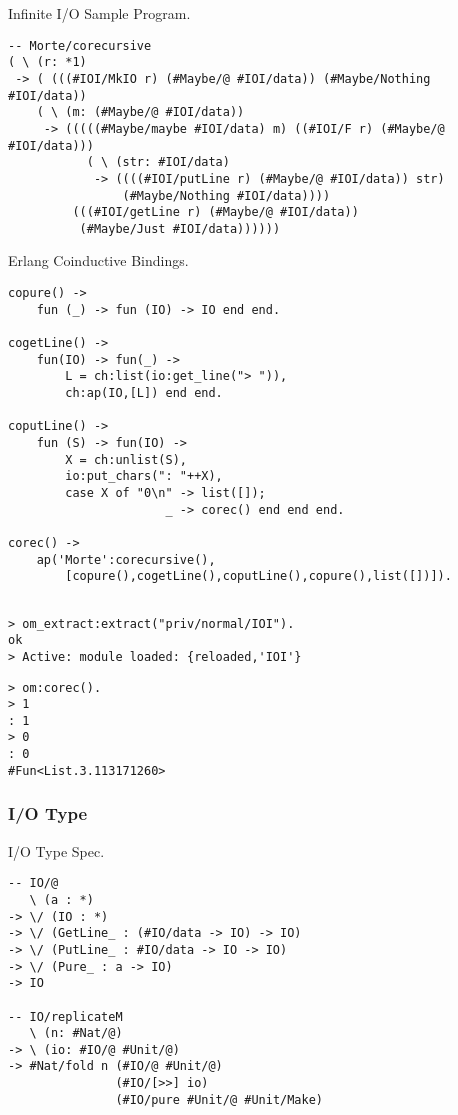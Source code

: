 \newpage
Infinite I/O Sample Program.

\begin{lstlisting}[mathescape=true]
-- Morte/corecursive
( \ (r: *1)
 -> ( (((#IOI/MkIO r) (#Maybe/@ #IOI/data)) (#Maybe/Nothing #IOI/data))
    ( \ (m: (#Maybe/@ #IOI/data))
     -> (((((#Maybe/maybe #IOI/data) m) ((#IOI/F r) (#Maybe/@ #IOI/data)))
           ( \ (str: #IOI/data)
            -> ((((#IOI/putLine r) (#Maybe/@ #IOI/data)) str)
                (#Maybe/Nothing #IOI/data))))
         (((#IOI/getLine r) (#Maybe/@ #IOI/data))
          (#Maybe/Just #IOI/data))))))
\end{lstlisting}

\newpage
Erlang Coinductive Bindings.

\begin{lstlisting}[mathescape=true]
copure() ->
    fun (_) -> fun (IO) -> IO end end.

cogetLine() ->
    fun(IO) -> fun(_) ->
        L = ch:list(io:get_line("> ")),
        ch:ap(IO,[L]) end end.

coputLine() ->
    fun (S) -> fun(IO) ->
        X = ch:unlist(S),
        io:put_chars(": "++X),
        case X of "0\n" -> list([]);
                      _ -> corec() end end end.

corec() ->
    ap('Morte':corecursive(),
        [copure(),cogetLine(),coputLine(),copure(),list([])]).
\end{lstlisting}

\begin{lstlisting}[mathescape=true]

> om_extract:extract("priv/normal/IOI").
ok
> Active: module loaded: {reloaded,'IOI'}
\end{lstlisting}

\begin{lstlisting}[mathescape=true]
> om:corec().
> 1
: 1
> 0
: 0
#Fun<List.3.113171260>
\end{lstlisting}

\newpage
\subsubsection{I/O Type}

I/O Type Spec.

\begin{lstlisting}[mathescape=true]
-- IO/@
   \ (a : *)
-> \/ (IO : *)
-> \/ (GetLine_ : (#IO/data -> IO) -> IO)
-> \/ (PutLine_ : #IO/data -> IO -> IO)
-> \/ (Pure_ : a -> IO)
-> IO

-- IO/replicateM
   \ (n: #Nat/@)
-> \ (io: #IO/@ #Unit/@)
-> #Nat/fold n (#IO/@ #Unit/@)
               (#IO/[>>] io)
               (#IO/pure #Unit/@ #Unit/Make)
\end{lstlisting}

